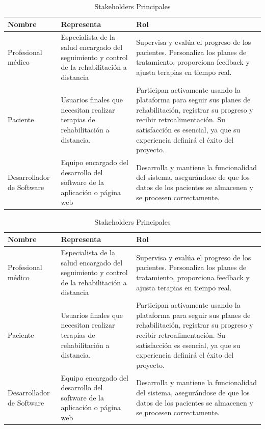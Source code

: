 \documentclass{article}
\begin{document}
	\begin{table}[ht]
		\centering
		\caption{Stakeholders Principales}
		\begin{tabular}{@{} p{3cm} p{6cm} p{7cm} @{}}
			\toprule
			\textbf{Nombre} & \textbf{Representa} & \textbf{Rol} \\
			\midrule
			Profesional médico & 
			Especialista de la salud encargado del seguimiento y control de la rehabilitación a distancia & 
			Supervisa y evalúa el progreso de los pacientes. \newline Personaliza los planes de tratamiento, proporciona feedback y ajusta terapias en tiempo real. \\
			
			\addlinespace
			
			Paciente & 
			Usuarios finales que necesitan realizar terapias de rehabilitación a distancia. & 
			Participan activamente usando la plataforma para seguir sus planes de rehabilitación, registrar su progreso y recibir retroalimentación. Su satisfacción es esencial, ya que su experiencia definirá el éxito del proyecto. \\
			
			\addlinespace
			
			Desarrollador de Software & 
			Equipo encargado del desarrollo del software de la aplicación o página web & 
			Desarrolla y mantiene la funcionalidad del sistema, asegurándose de que los datos de los pacientes se almacenen y se procesen correctamente. \\
			\bottomrule
		\end{tabular}
	\end{table}
	
	
	\begin{table}[ht]
		\centering
		\caption{Stakeholders Principales}
		\begin{tabular}{| p{3cm} | p{6cm} | p{7cm} |}
			\hline
			\textbf{Nombre} & \textbf{Representa} & \textbf{Rol} \\
			\hline
			Profesional médico & 
			Especialista de la salud encargado del seguimiento y control de la rehabilitación a distancia & 
			Supervisa y evalúa el progreso de los pacientes. \newline Personaliza los planes de tratamiento, proporciona feedback y ajusta terapias en tiempo real. \\
			\hline
			Paciente & 
			Usuarios finales que necesitan realizar terapias de rehabilitación a distancia. & 
			Participan activamente usando la plataforma para seguir sus planes de rehabilitación, registrar su progreso y recibir retroalimentación. Su satisfacción es esencial, ya que su experiencia definirá el éxito del proyecto. \\
			\hline
			Desarrollador de Software & 
			Equipo encargado del desarrollo del software de la aplicación o página web & 
			Desarrolla y mantiene la funcionalidad del sistema, asegurándose de que los datos de los pacientes se almacenen y se procesen correctamente. \\
			\hline
		\end{tabular}
	\end{table}
	
\end{document}
